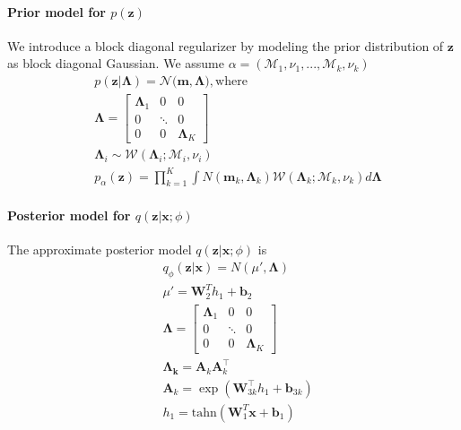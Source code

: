 \paragraph{Prior model for $p(\mathbf{z})$}
We introduce a block diagonal regularizer by modeling the prior distribution of $\mathbf{z}$ as block diagonal Gaussian. We assume $\alpha=(\mathcal{M}_{1}, \nu_{1},...,\mathcal{M}_{k},\nu_{k})$
\begin{align}
& p(\mathbf{z}| \mathbf{\Lambda}) = \mathcal{N}(\mathbf{m},\mathbf{\Lambda)}, \mbox{where} \nonumber\\
& \mathbf{\Lambda} = \begin{bmatrix}
\mathbf{\Lambda}_1 & 0 & 0 \\
0 & \ddots & 0  \\
0 & 0 & \mathbf{\Lambda}_{K}
\end{bmatrix} \\
& \mathbf{\Lambda}_{i} \sim \mathcal{W}(\mathbf{\Lambda}_{i}; \mathcal{M}_{i}, \nu_{i})\\
& p_{\alpha}(\mathbf{z}) = \prod_{k=1}^{K}  \int N(\mathbf{m}_k, \mathbf{\Lambda}_k) \mathcal{W}(\mathbf{\Lambda}_{k}; \mathcal{M}_{k}, \nu_{k}) d\mathbf{\Lambda}
\end{align}

\paragraph{Posterior model for $q(\mathbf{z}|\mathbf{x};\phi)$}
The approximate posterior model $q(\mathbf{z}|\mathbf{x};\phi)$ is
\begin{align}
& q_{\phi}(\mathbf{z}|\mathbf{x})=N(\mu', \mathbf{\Lambda}) \\
& \mu' = \mathbf{W}_2^T h_1 + \mathbf{b}_2 \\
&\mathbf{\Lambda} = \begin{bmatrix}
\mathbf{\Lambda}_1 & 0 & 0 \\
0 & \ddots & 0  \\
0 & 0 & \mathbf{\Lambda}_{K}
\end{bmatrix} \\
& \mathbf{\Lambda_k} = \mathbf{A}_k\mathbf{A}_k^{\top}\\
& \mathbf{A}_k= \exp(\mathbf{W}_{3k}^{\top}h_1 + \mathbf{b}_{3k})\\
& h_1 = \mbox{tahn}(\mathbf{W}_1^T\mathbf{x} + \mathbf{b}_1)
\end{align}


